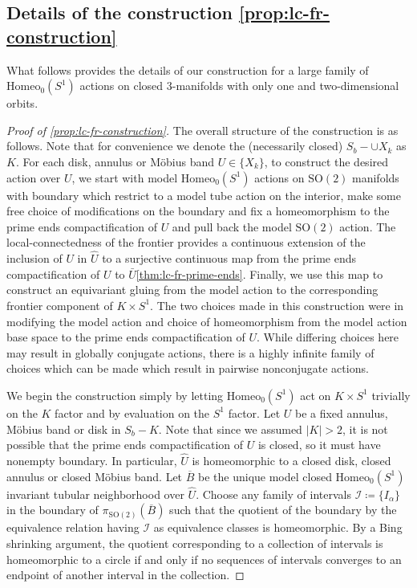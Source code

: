 \documentclass[10pt, oneside]{article}
\newcommand{\SO}[1][2]{\text{SO}(#1)}
\newcommand{\homeo}[1][S^1]{\text{Homeo}_0(#1)}
\newcommand{\cl}[1]{\overline{#1}}
\theoremstyle{definition}
\theoremstyle{definition}
\begin{document}
\subsection{Details of the construction \texorpdfstring{\cref{prop:lc-fr-construction}}{Proposition \ref*{prop:lc-fr-construction}}}\label{subsec:details-of-construction}
What follows provides the details of our construction for a large family of $\homeo$ actions on closed 3-manifolds with only one and two-dimensional orbits.
\begin{proof}[Proof of \cref{prop:lc-fr-construction}]
    The overall structure of the construction is as follows. Note that for convenience we denote the (necessarily closed) $S_b - \cup X_k$ as $K$.
    For each disk, annulus or M\"{o}bius band $U\in\{X_k\}$, to construct the desired action over $U$, we start with model $\homeo$ actions on $\SO$ manifolds with boundary which restrict to a model tube action on the interior, make some free choice of modifications on the boundary and fix a homeomorphism to the prime ends compactification of $U$ and pull back the model $\SO$ action. The local-connectedness of the frontier provides a continuous extension of the inclusion of $U$ in $\hat{U}$ to a surjective continuous map from the prime ends compactification of $U$ to $\bar{U}$\cref{thm:lc-fr-prime-ends}. Finally, we use this map to construct an equivariant gluing from the model action to the corresponding frontier component of $K\times S^1$. The two choices made in this construction were in modifying the model action and choice of homeomorphism from the model action base space to the prime ends compactification of $U$. While differing choices here may result in globally conjugate actions, there is a highly infinite family of choices which can be made which result in pairwise nonconjugate actions.

    We begin the construction simply by letting $\homeo$ act on $K\times S^1$ trivially on the $K$ factor and by evaluation on the $S^1$ factor. Let $U$ be a fixed annulus, M\"{o}bius band or disk in $S_b - K$. Note that since we assumed $\lvert K\rvert > 2$, it is not possible that the prime ends compactification of $U$ is closed, so it must have nonempty boundary. In particular, $\hat{U}$ is homeomorphic to a closed disk, closed annulus or closed M\"{o}bius band. Let $\cl{B}$ be the unique model closed $\homeo$ invariant tubular neighborhood over $\hat{U}$. Choose any family of intervals $\mathscr{I}\coloneqq \{I_\alpha\}$ in the boundary of $\pi_{\SO}(\cl{B})$ such that the quotient of the boundary by the equivalence relation having $\mathscr{I}$ as equivalence classes is homeomorphic. By a Bing shrinking argument, the quotient corresponding to a collection of intervals is homeomorphic to a circle if and only if no sequences of intervals converges to an endpoint of another interval in the collection.


\end{proof}
\end{document}
